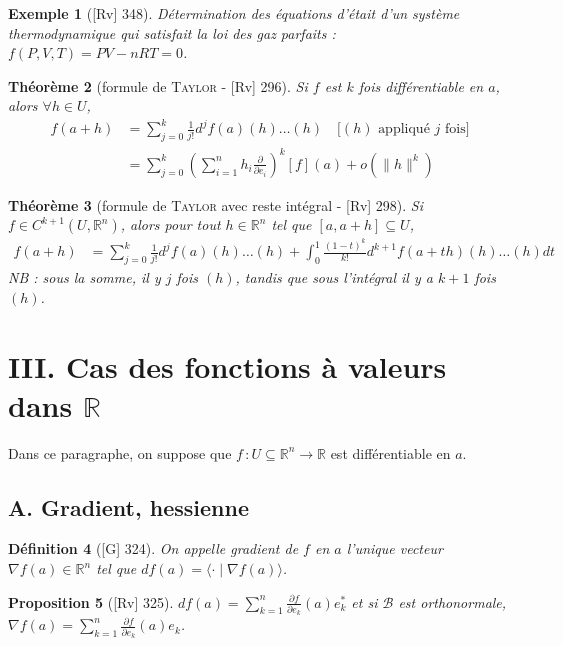 \documentclass[10pt, a4paper, parskip=full, twoside, twocolumn]{report}
\newtheorem{definition}{Définition}
\newtheorem{theorem}[definition]{Théorème}
\newtheorem{proposition}[definition]{Proposition}
\newtheorem{example}[definition]{Exemple}
\newcommand{\IR}{\mathbb{R}}
\newcommand{\B}{\mathcal{B}}
\newcommand{\ps}[2]{\langle #1\mid #2\rangle}
\begin{document}
\begin{example}[\textnormal{[Rv] 348}]
	Détermination des équations d'était d'un système thermodynamique qui satisfait la loi des gaz parfaits : $f(P,V,T) = PV - nRT = 0$.
\end{example}

\begin{theorem}[formule de \textsc{Taylor} - \textnormal{[Rv] 296}]
	Si $f$ est $k$ fois différentiable en $a$, alors $\forall h\in U$, 
	\begin{align*}
		f(a+h) &= \sum_{j=0}^{k}\frac{1}{j!}d^jf(a)(h)\dots (h)\quad \text{[$(h)$ appliqué $j$ fois]} \\
		&= \sum_{j=0}^{k}\left(\sum_{i=1}^{n} h_i\frac{\partial}{\partial e_i}\right)^k[f](a) + o(\|h\|^k)
	\end{align*}
\end{theorem}

\begin{theorem}[formule de \textsc{Taylor} avec reste intégral - \textnormal{[Rv] 298}]
	Si $f\in C^{k+1}(U,\IR^n)$, alors pour tout $h\in\IR^n$ tel que $[a,a+h]\subseteq U$,
	\begin{align*}
		f(a+h) &= \sum_{j=0}^{k}\frac{1}{j!}d^jf(a)(h)\dots(h) + \int_{0}^{1}\frac{(1-t)^k}{k!}d^{k+1}f(a+th)(h)\dots(h)dt
	\end{align*} 
	NB : sous la somme, il y $j$ fois $(h)$, tandis que sous l'intégral il y a $k+1$ fois $(h)$.
\end{theorem}

\section*{III. Cas des fonctions à valeurs dans $\IR$}
\textcolor{paragraphtext}{Dans ce paragraphe, on suppose que $f\,\colon U\subseteq \IR^n\to \IR$ est différentiable en $a$.}

\subsection*{A. Gradient, hessienne}

\begin{definition}[\textnormal{[G] 324}]
	On appelle \emph{gradient de $f$ en $a$} l'unique vecteur $\nabla f(a)\in\IR^n$ tel que $df(a) = \ps{\cdot}{\nabla f(a)}$.
\end{definition}

\begin{proposition}[\textnormal{[Rv] 325}]
	$df(a) = \sum_{k=1}^{n}\frac{\partial f}{\partial e_k}(a)e_k^*$ et si $\B$ est orthonormale, $\nabla f(a) = \sum_{k=1}^{n} \frac{\partial f}{\partial e_k}(a)e_k$.
\end{proposition}
\end{document}
